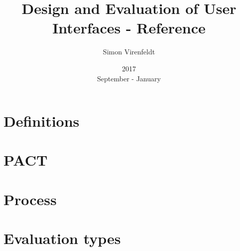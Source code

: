 \documentclass[10pt,a4paper,oneside,twocolumn]{article}
\author{Simon Virenfeldt}
\title{Design and Evaluation of User Interfaces - Reference}
\date{2017\\September - January}
\begin{document}
    \maketitle
	\section{Definitions}
	
	\section{PACT}
	
	\section{Process}
	
	\section{Evaluation types}
	
\end{document}
